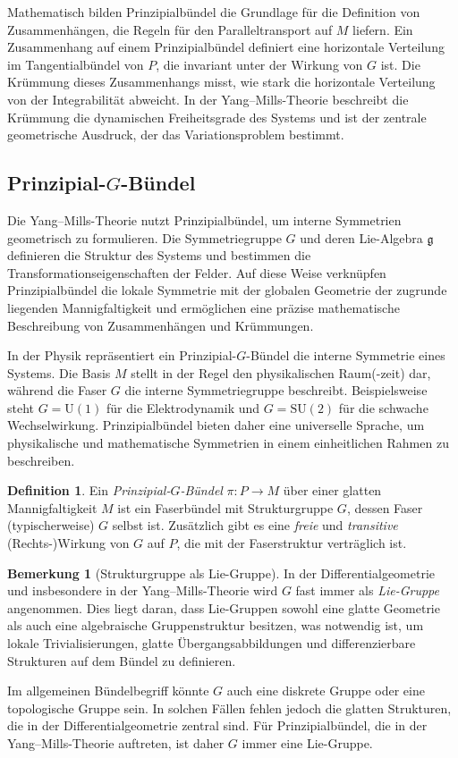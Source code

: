 \documentclass[10pt, letterpaper]{article}
\theoremstyle{custom}
\theoremstyle{definition}
\newtheorem{definition}[theorem]{Definition}
\newtheorem{remark}[theorem]{Bemerkung}
\begin{document}
Mathematisch bilden Prinzipialbündel die Grundlage für die Definition von Zusammenhängen, die Regeln für den Paralleltransport auf \(M\) liefern. Ein Zusammenhang auf einem Prinzipialbündel definiert eine horizontale Verteilung im Tangentialbündel von \(P\), die invariant unter der Wirkung von \(G\) ist. Die Krümmung dieses Zusammenhangs misst, wie stark die horizontale Verteilung von der Integrabilität abweicht. In der Yang--Mills-Theorie beschreibt die Krümmung die dynamischen Freiheitsgrade des Systems und ist der zentrale geometrische Ausdruck, der das Variationsproblem bestimmt.

\subsection{Prinzipial-\(G\)-Bündel}


Die Yang--Mills-Theorie nutzt Prinzipialbündel, um interne Symmetrien geometrisch zu formulieren. Die Symmetriegruppe \(G\) und deren Lie-Algebra \(\mathfrak{g}\) definieren die Struktur des Systems und bestimmen die Transformationseigenschaften der Felder. Auf diese Weise verknüpfen Prinzipialbündel die lokale Symmetrie mit der globalen Geometrie der zugrunde liegenden Mannigfaltigkeit und ermöglichen eine präzise mathematische Beschreibung von Zusammenhängen und Krümmungen.

In der Physik repräsentiert ein Prinzipial-\(G\)-Bündel die interne Symmetrie eines Systems. Die Basis \(M\) stellt in der Regel den physikalischen Raum(-zeit) dar, während die Faser \(G\) die interne Symmetriegruppe beschreibt. Beispielsweise steht \(G = \mathrm{U}(1)\) für die Elektrodynamik und \(G = \mathrm{SU}(2)\) für die schwache Wechselwirkung. Prinzipialbündel bieten daher eine universelle Sprache, um physikalische und mathematische Symmetrien in einem einheitlichen Rahmen zu beschreiben.


\begin{definition}
Ein \emph{Prinzipial-\(G\)-Bündel} \(\pi: P \to M\) über einer glatten Mannigfaltigkeit \(M\) ist ein Faserbündel mit Strukturgruppe \(G\), dessen Faser (typischerweise) \(G\) selbst ist. Zusätzlich gibt es eine \emph{freie} und \emph{transitive} (Rechts-)Wirkung von \(G\) auf \(P\), die mit der Faserstruktur verträglich ist.
\end{definition}

\begin{remark}[Strukturgruppe als Lie-Gruppe]
In der Differentialgeometrie und insbesondere in der Yang--Mills-Theorie wird \(G\) fast immer als \emph{Lie-Gruppe} angenommen. Dies liegt daran, dass Lie-Gruppen sowohl eine glatte Geometrie als auch eine algebraische Gruppenstruktur besitzen, was notwendig ist, um lokale Trivialisierungen, glatte Übergangsabbildungen und differenzierbare Strukturen auf dem Bündel zu definieren.  

Im allgemeinen Bündelbegriff könnte \(G\) auch eine diskrete Gruppe oder eine topologische Gruppe sein. In solchen Fällen fehlen jedoch die glatten Strukturen, die in der Differentialgeometrie zentral sind. Für Prinzipialbündel, die in der Yang--Mills-Theorie auftreten, ist daher \(G\) immer eine Lie-Gruppe.
\end{remark}
\end{document}

